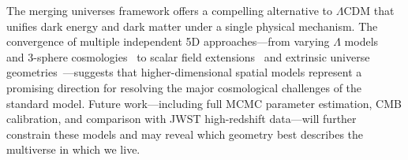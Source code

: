 \documentclass[12pt]{article}
\begin{document}
The merging universes framework offers a compelling alternative to $\Lambda$CDM that unifies dark energy and dark matter under a single physical mechanism. The convergence of multiple independent 5D approaches---from varying $\Lambda$ models~\cite{panigrahi2007} and 3-sphere cosmologies~\cite{ramirez2025} to scalar field extensions~\cite{masarrat2025} and extrinsic universe geometries~\cite{silva2024}---suggests that higher-dimensional spatial models represent a promising direction for resolving the major cosmological challenges of the standard model. Future work---including full MCMC parameter estimation, CMB calibration, and comparison with JWST high-redshift data---will further constrain these models and may reveal which geometry best describes the multiverse in which we live.



\end{document}
